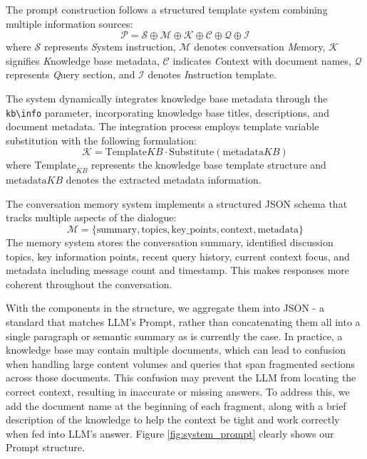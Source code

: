 \documentclass[10pt,twocolumn,letterpaper]{article}
\begin{document}
\vspace{0.5em}
The prompt construction follows a structured template system combining multiple information sources:
$$\mathcal{P} = \mathcal{S} \oplus \mathcal{M} \oplus \mathcal{K} \oplus \mathcal{C} \oplus \mathcal{Q} \oplus \mathcal{I}$$
where $\mathcal{S}$ represents \textit{S}ystem instruction, $\mathcal{M}$ denotes conversation \textit{M}emory, $\mathcal{K}$ signifies \textit{K}nowledge base metadata, $\mathcal{C}$ indicates \textit{C}ontext with document names, $\mathcal{Q}$ represents \textit{Q}uery section, and $\mathcal{I}$ denotes \textit{I}nstruction template.

\vspace{0.5em}
The system dynamically integrates knowledge base metadata through the \texttt{kb\textbackslash info} parameter, incorporating knowledge base titles, descriptions, and document metadata. The integration process employs template variable substitution with the following formulation:
$$\mathcal{K} = \text{Template}{KB} \cdot \text{Substitute}(\text{metadata}{KB})$$
where $\text{Template}_{KB}$ represents the knowledge base template structure and $\text{metadata}{KB}$ denotes the extracted metadata information.

\vspace{0.5em}
The conversation memory system implements a structured JSON schema that tracks multiple aspects of the dialogue:
$$\mathcal{M} = \{\text{summary}, \text{topics}, \text{key\_points}, \text{context}, \text{metadata}\}$$
The memory system stores the conversation summary, identified discussion topics, key information points, recent query history, current context focus, and metadata including message count and timestamp. This makes responses more coherent throughout the conversation.

\vspace{0.5em}
With the components in the structure, we aggregate them into JSON - a standard that matches LLM's Prompt, rather than concatenating them all into a single paragraph or semantic summary as is currently the case. In practice, a knowledge base may contain multiple documents, which can lead to confusion when handling large content volumes and queries that span fragmented sections across those documents. This confusion may prevent the LLM from locating the correct context, resulting in inaccurate or missing answers. To address this, we add the document name at the beginning of each fragment, along with a brief description of the knowledge to help the context be tight and work correctly when fed into LLM's answer. Figure \ref{fig:system_prompt} clearly shows our Prompt structure.
\end{document}
